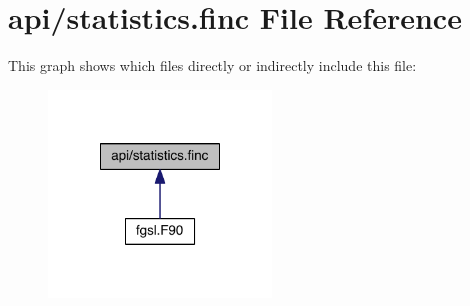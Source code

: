 \hypertarget{statistics_8finc}{\section{api/statistics.finc File Reference}
\label{statistics_8finc}
}
This graph shows which files directly or indirectly include this file\-:\nopagebreak
\begin{figure}[H]
\begin{center}
\leavevmode
\includegraphics[width=168pt]{statistics_8finc__dep__incl}
\end{center}
\end{figure}
